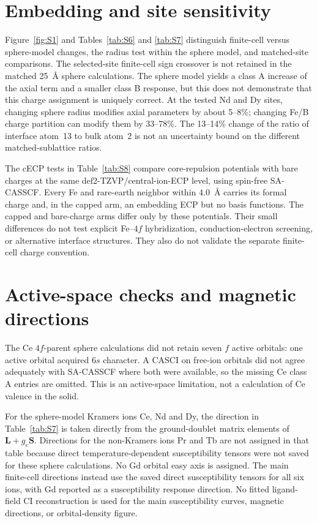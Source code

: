 \documentclass[11pt]{article}
\begin{document}
\section{Embedding and site sensitivity}
Figure~\ref{fig:S1} and Tables~\ref{tab:S6} and \ref{tab:S7} distinguish finite-cell versus sphere-model changes, the radius test within the sphere model, and matched-site comparisons. The selected-site finite-cell sign crossover is not retained in the matched 25~\AA{} sphere calculations. The sphere model yields a class A increase of the axial term and a smaller class B response, but this does not demonstrate that this charge assignment is uniquely correct. At the tested Nd and Dy sites, changing sphere radius modifies axial parameters by about 5--8\%; changing Fe/B charge partition can modify them by 33--78\%. The 13--14\% change of the ratio of interface atom~13 to bulk atom~2 is not an uncertainty bound on the different matched-sublattice ratios.

The cECP tests in Table~\ref{tab:S8} compare core-repulsion potentials with bare charges at the same def2-TZVP/central-ion-ECP level, using spin-free SA-CASSCF. Every Fe and rare-earth neighbor within 4.0~\AA{} carries its formal charge and, in the capped arm, an embedding ECP but no basis functions. The capped and bare-charge arms differ only by these potentials. Their small differences do not test explicit Fe--$4f$ hybridization, conduction-electron screening, or alternative interface structures. They also do not validate the separate finite-cell charge convention.

\section{Active-space checks and magnetic directions}
The Ce $4f$-parent sphere calculations did not retain seven $f$ active orbitals: one active orbital acquired $6s$ character. A CASCI on free-ion orbitals did not agree adequately with SA-CASSCF where both were available, so the missing Ce class A entries are omitted. This is an active-space limitation, not a calculation of Ce valence in the solid.

For the sphere-model Kramers ions Ce, Nd and Dy, the direction in Table~\ref{tab:S7} is taken directly from the ground-doublet matrix elements of $\mathbf L+g_e\mathbf S$. Directions for the non-Kramers ions Pr and Tb are not assigned in that table because direct temperature-dependent susceptibility tensors were not saved for these sphere calculations. No Gd orbital easy axis is assigned. The main finite-cell directions instead use the saved direct susceptibility tensors for all six ions, with Gd reported as a susceptibility response direction. No fitted ligand-field CI reconstruction is used for the main susceptibility curves, magnetic directions, or orbital-density figure.
\end{document}
